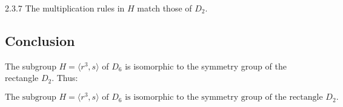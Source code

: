 \documentclass[12pt]{amsart}
\theoremstyle{definition}
\numberwithin{equation}{section}
\begin{document}
\begin{exercise}{2.3.7}
    The multiplication rules in \(H\) match those of \(D_2\).
    
    \subsection*{Conclusion}
    
    The subgroup \(H = \langle r^3, s \rangle\) of \(D_6\) is isomorphic to the symmetry group of the rectangle \(D_2\). Thus:
    
    \[
    \text{The subgroup } H = \langle r^3, s \rangle \text{ of } D_6 \text{ is isomorphic to the symmetry group of the rectangle } D_2.
    \]
    
    \end{exercise}
    \newpage
    

\end{document}
